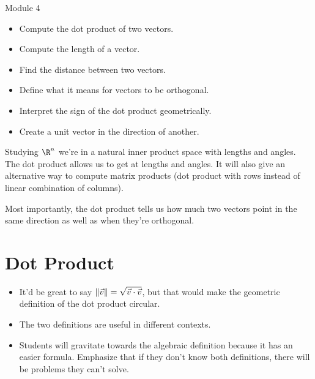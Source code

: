 \begin{lesson}

	Module 4

	\begin{itemize}
		\item Compute the dot product of two vectors.
		\item Compute the length of a vector.
		\item Find the distance between two vectors.
		\item Define what it means for vectors to be orthogonal.
		\item Interpret the sign of the dot product geometrically.
		\item Create a unit vector in the direction of another.
	\end{itemize}

	Studying $\R^n$ we're in a natural inner product space with lengths and
	angles. The dot product allows us to get at lengths and angles. It will
	also give an alternative way to compute matrix products (dot product with rows
	instead of linear combination of columns).

	Most importantly, the dot product tells us how much two vectors point in
	the same direction as well as when they're orthogonal.

\end{lesson}


	\bookonlynewpage
\section*{Dot Product}
	\begin{annotation}
		\begin{notes}
			\begin{itemize}
				\item It'd be great to say $\lVert\vec v\rVert=\sqrt{\vec v\cdot \vec v}$,
					but that would make the geometric definition of the dot product circular.
			\end{itemize}
		\end{notes}
	\end{annotation}

	\SavedDefinitionRender{Norm}

	\begin{annotation}
		\begin{notes}
			\begin{itemize}
				\item The two definitions are useful in different contexts.
				\item Students will gravitate towards the algebraic definition because
					it has an easier formula. Emphasize that if they don't know
					both definitions, there will be problems they can't solve.
			\end{itemize}
		\end{notes}
	\end{annotation}

